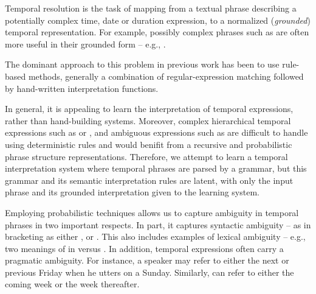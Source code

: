 
Temporal resolution is the task of mapping from a textual phrase describing
	a potentially complex time, date or duration expression, to a normalized
	(\textit{grounded}) temporal representation.
For example, possibly complex phrases such as  are
	often more useful in their grounded form -- e.g., .


The dominant approach to this problem in previous work has been to use
	rule-based methods, generally a combination of regular-expression matching
	followed by hand-written interpretation functions.

In general, it is appealing to learn the interpretation of temporal expressions,
	rather than hand-building systems.
Moreover, complex hierarchical temporal expressions such as 
	 or ,
	and ambiguous expressions such as  are difficult to
	handle using deterministic rules and would benifit from a
	recursive and probabilistic phrase structure representations.
Therefore, we attempt to learn
	a temporal interpretation system where temporal phrases are parsed by
	a grammar, but this grammar and its semantic interpretation rules are
	latent, with only the input phrase and its grounded interpretation given
	to the learning system.

Employing probabilistic techniques allows us to capture ambiguity in temporal 
	phrases in two important respects.
In part, it captures syntactic ambiguity -- as in  bracketing as either , or
	.
This also includes examples of lexical ambiguity -- e.g., two
	meanings of  in  versus .
In addition, temporal expressions often carry a pragmatic ambiguity.
For instance, a speaker may refer to either the next or previous Friday
	when he utters  on a Sunday.
Similarly,  can refer to either the coming week or the week
	thereafter.

